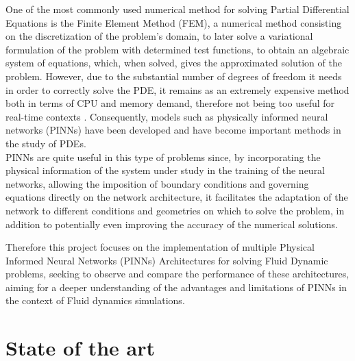 \documentclass[12pt,letterpaper]{article}
\begin{document}
One of the most commonly used numerical method for solving Partial Differential Equations is the Finite Element Method (FEM), a numerical method consisting on the discretization of the problem's domain, to later solve a variational formulation of the problem with determined test functions, to obtain an algebraic system of equations, which, when solved, gives the approximated solution of the problem. However, due to the substantial number of degrees of freedom it needs in order to correctly solve the PDE, it remains as an extremely expensive method both in terms of CPU and memory demand, therefore not being too useful for real-time contexts\cite{hesthaven2018non} \cite{PINNQuarteroni}. Consequently, models such as physically informed neural networks (PINNs) have been developed and have become important methods in the study of PDEs.\\

PINNs are quite useful in this type of problems since, by incorporating the physical information of the system under study in the training of the neural networks, allowing the imposition of boundary conditions and governing equations directly on the network architecture, it facilitates the adaptation of the network to different conditions and geometries on which to solve the problem, in addition to potentially even improving the accuracy of the numerical solutions.

Therefore this project focuses on the implementation of multiple Physical Informed Neural Networks (PINNs) Architectures for solving Fluid Dynamic problems, seeking to observe and compare the performance of these architectures, aiming for a deeper understanding of the advantages and limitations of PINNs in the context of Fluid dynamics simulations.

\section{State of the art}

\end{document}

